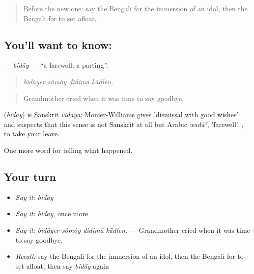 \label{lesson:BN-C308-biday}



\begin{quote}
Before the new one: say the Bengali for the immersion of an idol, then the Bengali for to set afloat.
\end{quote}

\subsection*{You'll want to know: }
\textbf{} — \emph{bidāy} — \textquotedblleft{}a farewell; a parting\textquotedblright{}.

\begin{quote}
   
\end{quote}

\begin{quote}
\emph{bidāyer sômôy didimā kā̃dlen.}
\end{quote}

\begin{quote}
Grandmother cried when it was time to say goodbye.
\end{quote}

\begin{cousinweb}
\textbf{} (\emph{bidāy}) is Sanskrit \emph{vidāya}; Monier-Williams gives 'dismissal with good wishes' and suspects that this sense is not Sanskrit at all but Arabic \emph{wadāʿ}, 'farewell'.  , to take your leave.
\end{cousinweb}

\begin{grammarlens}[title={What you've built}]
One more word for telling what happened.
\end{grammarlens}

\subsection*{Your turn}
\begin{itemize}
\raggedright
  \item \emph{Say it:} \emph{bidāy}
  \item \emph{Say it:} \emph{bidāy}, once more
  \item \emph{Say it:} \emph{bidāyer sômôy didimā kā̃dlen.} — Grandmother cried when it was time to say goodbye.
  \item \emph{Recall:} say the Bengali for the immersion of an idol, then the Bengali for to set afloat, then say \emph{bidāy} again
\end{itemize}

